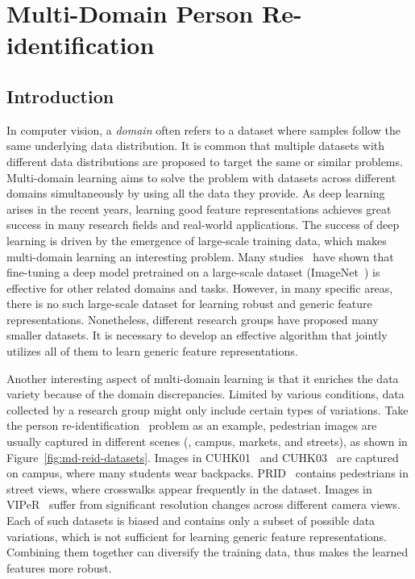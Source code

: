 \chapter{Multi-Domain Person Re-identification}
\label{ch:multi-domain}

\newcommand{\specialcell}[2][c]{\begin{tabular}[#1]{@{}c@{}}#2\end{tabular}}

\section{Introduction} %
\label{sec:md-introduction}

In computer vision, a \emph{domain} often refers to a dataset where samples follow the same underlying data distribution. It is common that multiple datasets with different data distributions are proposed to target the same or similar problems. Multi-domain learning aims to solve the problem with datasets across different domains simultaneously by using all the data they provide. As deep learning arises in the recent years, learning good feature representations achieves great success in many research fields and real-world applications. The success of deep learning is driven by the emergence of large-scale training data, which makes multi-domain learning an interesting problem. Many studies~\cite{donahue2013decaf,azizpour2014generic,oquab2014learning} have shown that fine-tuning a deep model pretrained on a large-scale dataset (\eg ImageNet~\cite{deng2009imagenet}) is effective for other related domains and tasks. However, in many specific areas, there is no such large-scale dataset for learning robust and generic feature representations. Nonetheless, different research groups have proposed many smaller datasets. It is necessary to develop an effective algorithm that jointly utilizes all of them to learn generic feature representations.

Another interesting aspect of multi-domain learning is that it enriches the data variety because of the domain discrepancies. Limited by various conditions, data collected by a research group might only include certain types of variations. Take the person re-identification~\cite{ajakan2014domain,li2014deepreid} problem as an example, pedestrian images are usually captured in different scenes (\eg, campus, markets, and streets), as shown in Figure~\ref{fig:md-reid-datasets}. Images in CUHK01~\cite{li2013locally} and CUHK03~\cite{li2014deepreid} are captured on campus, where many students wear backpacks. PRID~\cite{hirzer11a} contains pedestrians in street views, where crosswalks appear frequently in the dataset. Images in VIPeR~\cite{gray2007evaluating} suffer from significant resolution changes across different camera views. Each of such datasets is biased and contains only a subset of possible data variations, which is not sufficient for learning generic feature representations. Combining them together can diversify the training data, thus makes the learned features more robust.

